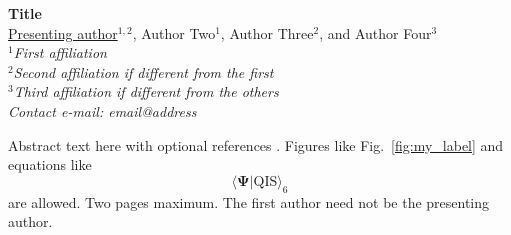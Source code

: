\documentclass[11pt]{article}                                  %
\begin{document}

\begin{center}                                                 %

{\bf                                                           %
%
Title
\\ 
}                                                             %
\vspace{2ex}                                                  %
% 
\underline{Presenting author}$^{1,2}$, 
Author Two$^{1}$,
Author Three$^{2}$,
and Author Four$^{3}$
\\
\vspace{2ex}                                                  %
{\sl                                                          %
%
$^{1}$First affiliation\\
$^{2}$Second affiliation if different from the first\\
$^{3}$Third affiliation if different from the others\\
}                                                             %
\vspace{1ex}                                                  %
{\small \sl                                                   %
%
Contact e-mail: email@address\\

}                                                             %
\end{center}                                                  %
\vspace{5mm}                                                  %
%
%
Abstract text here with optional references \cite{ref1}. Figures like Fig.~\ref{fig:my_label} and equations like
\begin{equation}
    \langle \boldsymbol{\Psi} | \text{QIS} \rangle _ 6
\end{equation}
are allowed. Two pages maximum. The first author need not be the presenting author. 
\end{document}
